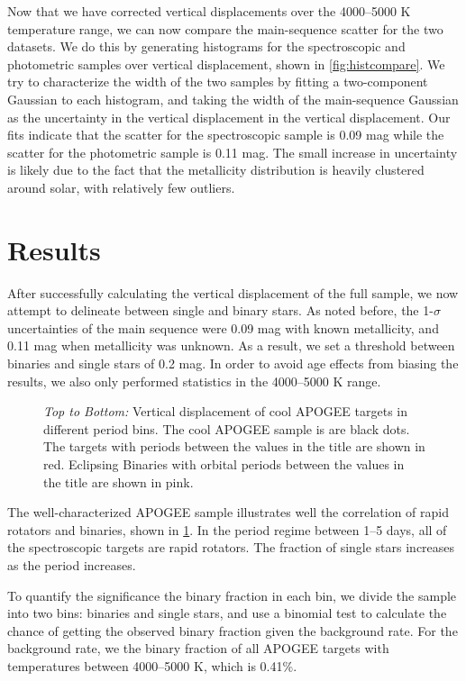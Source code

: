 \documentclass[manuscript]{aastex6}
\begin{document}
Now that we have corrected vertical displacements over the 4000--5000 K
temperature range, we can now compare the main-sequence scatter for the two
datasets. We do this by generating histograms for the spectroscopic and
photometric samples over vertical displacement, shown in
\cref{fig:histcompare}. We try to characterize the width of the two samples by
fitting a two-component Gaussian to each histogram, and taking the width of the
main-sequence Gaussian as the uncertainty in the vertical displacement in the
vertical displacement. Our fits indicate that the scatter for the spectroscopic
sample is 0.09 mag while the scatter for the photometric sample is 0.11 mag.
The small increase in uncertainty is likely due to the fact that the
metallicity distribution is heavily clustered around solar, with relatively few
outliers.

\section{Results}
\label{sec:results}


After successfully calculating the vertical displacement of the full sample, we
now attempt to delineate between single and binary stars. As noted before, the
1-\(\sigma\) uncertainties of the main sequence were 0.09 mag with known
metallicity, and 0.11 mag when metallicity was unknown. As a result, we set a
threshold between binaries and single stars of 0.2 mag. In order to avoid
age effects from biasing the results, we also only performed statistics in the
4000--5000 K range.

\begin{figure}[htb]
    \centering
    \caption{\emph{Top to Bottom:} Vertical displacement of cool APOGEE targets
    in different period bins. The cool APOGEE sample is are black dots. The
targets with \citet{McQuillan14} periods between the values in the title are
shown in red. Eclipsing Binaries with orbital periods between the values in the
title are shown in pink.}
    \label{fig:apogee_rapid_excess}
\end{figure}

The well-characterized APOGEE sample illustrates well the
correlation of rapid rotators and binaries, shown in
\cref{fig:apogee_rapid_excess}. In the period regime between 1--5 days, all of the
spectroscopic targets are rapid rotators. The fraction of single stars
increases as the period increases.

To quantify the significance the binary fraction in each bin, we divide the
sample into two bins: binaries and single stars, and use a binomial test to
calculate the chance of getting the observed binary fraction given the
background rate. For the background rate, we the binary fraction of all APOGEE 
targets with temperatures between 4000--5000 K, which is 0.41\%. 
\end{document}

